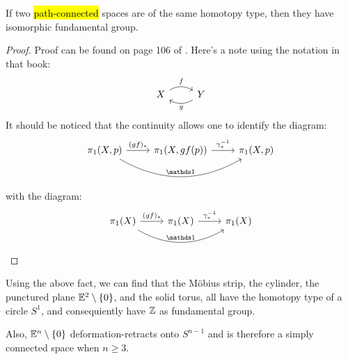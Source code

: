 \begin{thm}
    If two \hl{path-connected} spaces are of the same homotopy type, then
    they have isomorphic fundamental group.
\end{thm}
\begin{proof}
    Proof can be found on page 106 of \cite{book}. Here's a note using
    the notation in that book:
    $$ \begin{tikzcd}[]
        X\ar[r,"f",bend left] & Y\ar[l,"g",bend left]
    \end{tikzcd}$$
    It should be noticed that the continuity allows one to identify the
    diagram:
    $$ \begin{tikzcd}[]
        \pi_1(X,p)\ar[r,"(gf)_*"]\ar[rr,"\id",bend right]
            &\pi_1(X,gf(p))\ar[r,"\gamma^{-1}_*"]
            &\pi_1(X,p)
    \end{tikzcd} $$
    with the diagram:
    $$ \begin{tikzcd}[]
        \pi_1(X)\ar[r,"(gf)_*"]\ar[rr,"\id",bend right]
            &\pi_1(X)\ar[r,"\gamma^{-1}_*"]
            &\pi_1(X)
    \end{tikzcd} $$
\end{proof}

\begin{fact}
Using the above fact, we can find that the M\"obius strip, the cylinder,
the punctured plane $\mathbb{E}^2\setminus\{0\}$, and the solid torus, all
have the homotopy type of a circle $S^1$, and consequiently have $\mathbb{Z}$
as fundamental group.
\end{fact}
\begin{fact}
    Also, $\mathbb{E}^n\setminus\{0\}$ deformation-retracts onto $S^{n-1}$ and
    is therefore a simply connected space when $n\geq 3$.
\end{fact}

